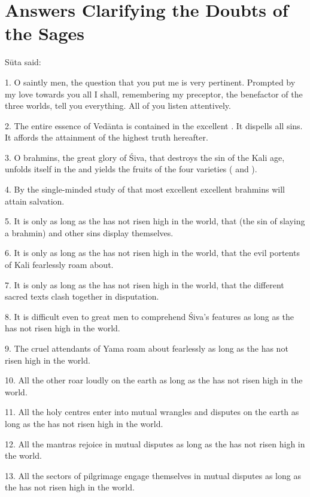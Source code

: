 \chapter{Answers Clarifying the Doubts of the Sages}

Sūta said:

1. O saintly men, the question that you put me is very pertinent. Prompted by my
love towards you all I shall, remembering my preceptor, the benefactor of the
three worlds, tell you everything. All of you listen attentively.

2. The entire essence of Vedānta is contained in the excellent .
It dispells all sins. It affords the attainment of the highest truth hereafter.

3. O brahmins, the great glory of Śiva, that destroys the sin of the Kali age,
unfolds itself in the  and yields the fruits of the four varieties
( and ).

4. By the single-minded study of that most excellent  excellent
brahmins will attain salvation.

5. It is only as long as the  has not risen high in the world,
that  (the sin of slaying a brahmin) and other sins display
themselves.

6. It is only as long as the  has not risen high in the world,
that the evil portents of Kali fearlessly roam about.

7. It is only as long as the  has not risen high in the world,
that the different sacred texts clash together in disputation.

8. It is difficult even to great men to comprehend Śiva’s features as long as
the  has not risen high in the world.

9. The cruel attendants of Yama roam about fearlessly as long as the
 has not risen high in the world.

10. All the other  roar loudly on the earth as long as the
 has not risen high in the world.

11. All the holy centres enter into mutual wrangles and disputes on the earth as
long as the  has not risen high in the world.

12. All the mantras rejoice in mutual disputes as long as the 
has not risen high in the world.

13. All the sectors of pilgrimage engage themselves in mutual disputes as long
as the  has not risen high in the world.

